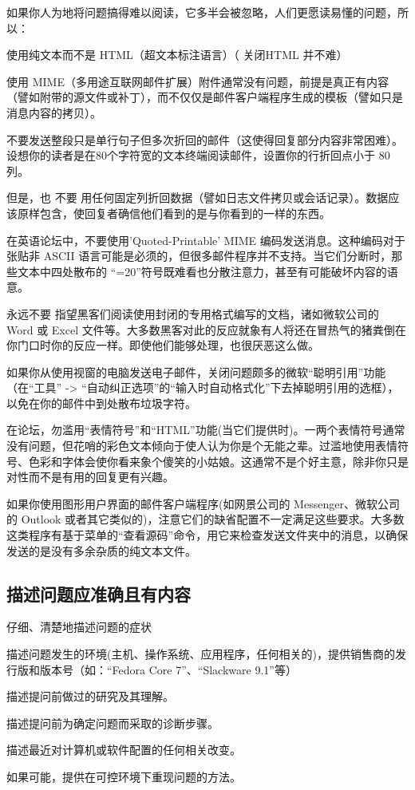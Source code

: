 如果你人为地将问题搞得难以阅读，它多半会被忽略，人们更愿读易懂的问题，所以：

\begin{compactitem}
\item 使用纯文本而不是 HTML（超文本标注语言）（ 关闭HTML 并不难）
\item 使用 MIME（多用途互联网邮件扩展）附件通常没有问题，前提是真正有内容（譬如附带的源文件或补丁），而不仅仅是邮件客户端程序生成的模板（譬如只是消息内容的拷贝）。
\item 不要发送整段只是单行句子但多次折回的邮件（这使得回复部分内容非常困难）。设想你的读者是在80个字符宽的文本终端阅读邮件，设置你的行折回点小于 80 列。
\item 但是，也 不要 用任何固定列折回数据（譬如日志文件拷贝或会话记录）。数据应该原样包含，使回复者确信他们看到的是与你看到的一样的东西。
\item 在英语论坛中，不要使用'Quoted-Printable' MIME 编码发送消息。这种编码对于张贴非 ASCII 语言可能是必须的，但很多邮件程序并不支持。当它们分断时，那些文本中四处散布的 “=20”符号既难看也分散注意力，甚至有可能破坏内容的语意。
\item 永远不要 指望黑客们阅读使用封闭的专用格式编写的文档，诸如微软公司的 Word 或 Excel 文件等。大多数黑客对此的反应就象有人将还在冒热气的猪粪倒在你门口时你的反应一样。即使他们能够处理，也很厌恶这么做。
\item 如果你从使用视窗的电脑发送电子邮件，关闭问题颇多的微软“聪明引用”功能（在“工具” -> “自动纠正选项”的“输入时自动格式化”下去掉聪明引用的选框），以免在你的邮件中到处散布垃圾字符。
\item 在论坛，勿滥用“表情符号”和“HTML”功能(当它们提供时)。一两个表情符号通常没有问题，但花哨的彩色文本倾向于使人认为你是个无能之辈。过滥地使用表情符号、色彩和字体会使你看来象个傻笑的小姑娘。这通常不是个好主意，除非你只是对性而不是有用的回复更有兴趣。
\end{compactitem}

如果你使用图形用户界面的邮件客户端程序(如网景公司的 Messenger、微软公司的 Outlook 或者其它类似的)，注意它们的缺省配置不一定满足这些要求。大多数这类程序有基于菜单的“查看源码”命令，用它来检查发送文件夹中的消息，以确保发送的是没有多余杂质的纯文本文件。






\subsection{描述问题应准确且有内容}

\begin{compactitem}
\item 仔细、清楚地描述问题的症状
\item 描述问题发生的环境(主机、操作系统、应用程序，任何相关的)，提供销售商的发行版和版本号（如：“Fedora Core 7”、“Slackware 9.1”等）
\item 描述提问前做过的研究及其理解。
\item 描述提问前为确定问题而采取的诊断步骤。
\item 描述最近对计算机或软件配置的任何相关改变。
\item 如果可能，提供在可控环境下重现问题的方法。
\end{compactitem}

